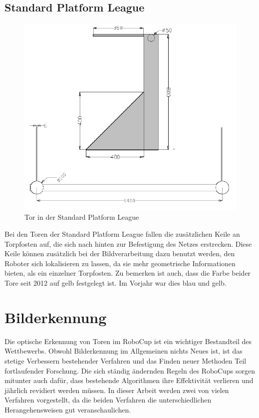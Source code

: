 \documentclass[a4paper,12pt]{article}
\begin{document}
\subsection{Standard Platform League}
\begin{figure}[H]
    \includegraphics[scale=0.8]{spl-goal.png}
    \caption{Tor in der Standard Platform League}
    \label{fig:goal-spl}
\end{figure}
Bei den Toren der Standard Platform League fallen die zusätzlichen Keile an Torpfosten auf, die
sich nach hinten zur Befestigung des Netzes erstrecken. Diese Keile können zusätzlich bei der
Bildverarbeitung dazu benutzt werden, den Roboter sich lokalisieren zu lassen, da sie mehr
geometrische Informationen bieten, als ein einzelner Torpfosten. Zu bemerken ist auch, dass die
Farbe beider Tore seit 2012 auf gelb festgelegt ist. Im Vorjahr war dies blau und gelb.

\section{Bilderkennung}
Die optische Erkennung von Toren im RoboCup ist ein wichtiger Bestandteil des Wettbewerbs. Obwohl
Bilderkennung im Allgemeinen nichts Neues ist, ist das stetige Verbessern bestehender Verfahren und das
Finden neuer Methoden Teil fortlaufender Forschung. Die sich ständig ändernden Regeln des RoboCups
sorgen mitunter auch dafür, dass bestehende Algorithmen ihre Effektivität verlieren und jährlich
revidiert werden müssen. In dieser Arbeit werden zwei von vielen Verfahren vorgestellt, da die
beiden Verfahren die unterschiedlichen Herangehensweisen gut veranschaulichen.
\end{document}
